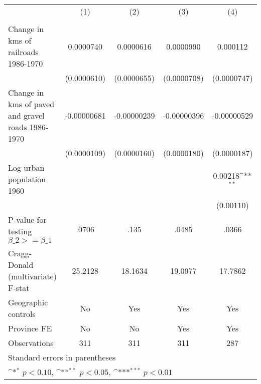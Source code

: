{
\def\sym#1{\ifmmode^{#1}\else\(^{#1}\)\fi}
\begin{tabular}{l*{4}{c}}
\hline\hline
                &\multicolumn{1}{c}{(1)}&\multicolumn{1}{c}{(2)}&\multicolumn{1}{c}{(3)}&\multicolumn{1}{c}{(4)}\\
                &\multicolumn{1}{c}{}&\multicolumn{1}{c}{}&\multicolumn{1}{c}{}&\multicolumn{1}{c}{}\\
\hline
Change in kms of railroads 1986-1970&0.0000740         &0.0000616         &0.0000990         & 0.000112         \\
                &(0.0000610)         &(0.0000655)         &(0.0000708)         &(0.0000747)         \\
[1em]
Change in kms of paved and gravel roads 1986-1970&-0.00000681         &-0.00000239         &-0.00000396         &-0.00000529         \\
                &(0.0000109)         &(0.0000160)         &(0.0000180)         &(0.0000187)         \\
[1em]
Log urban population 1960&                  &                  &                  &  0.00218\sym{**} \\
                &                  &                  &                  &(0.00110)         \\
\hline
P-value for testing $\beta\_{2} >= \beta\_{1}$&    .0706         &     .135         &    .0485         &    .0366         \\
Cragg-Donald (multivariate) F-stat&  25.2128         &  18.1634         &  19.0977         &  17.7862         \\
Geographic controls&       No         &      Yes         &      Yes         &      Yes         \\
Province FE     &       No         &       No         &      Yes         &      Yes         \\
Observations    &      311         &      311         &      311         &      287         \\
\hline\hline
\multicolumn{5}{l}{\footnotesize Standard errors in parentheses}\\
\multicolumn{5}{l}{\footnotesize \sym{*} \(p<0.10\), \sym{**} \(p<0.05\), \sym{***} \(p<0.01\)}\\
\end{tabular}
}
